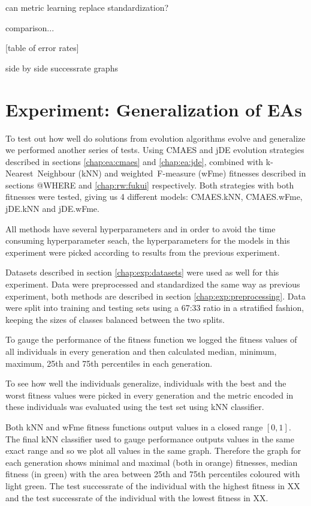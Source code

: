 \documentclass[12pt,a4paper]{report}
\begin{document}
can metric learning replace standardization?

comparison...

[table of error rates]

side by side successrate graphs


\section{Experiment: Generalization of EAs} \label{chap:exp:fitness}

To test out how well do solutions from evolution algorithms evolve and generalize we performed another series of tests. Using CMAES and jDE evolution strategies described in sections \ref{chap:ea:cmaes} and \ref{chap:ea:jde}, combined with k-Nearest~Neighbour (kNN) and weighted~F-measure (wFme) fitnesses described in sections @WHERE and \ref{chap:rw:fukui} respectively. Both strategies with both fitnesses were tested, giving us 4 different models: CMAES.kNN, CMAES.wFme, jDE.kNN and jDE.wFme.

All methods have several hyperparameters and in order to avoid the time consuming hyperparameter seach, the hyperparameters for the models in this experiment were picked according to results from the previous experiment.

Datasets described in section \ref{chap:exp:datasets} were used as well for this experiment. Data were preprocessed and standardized the same way as previous experiment, both methods are described in section \ref{chap:exp:preprocessing}. Data were split into training and testing sets using a 67:33 ratio in a stratified fashion, keeping the sizes of classes balanced between the two splits.

To gauge the performance of the fitness function we logged the fitness values of all individuals in every generation and then calculated median, minimum, maximum, 25th and 75th percentiles in each generation.

To see how well the individuals generalize, individuals with the best and the worst fitness values were picked in every generation and the metric encoded in these individuals was evaluated using the test set using kNN classifier.

Both kNN and wFme fitness functions output values in a closed range $[0,1]$. The final kNN classifier used to gauge performance outputs values in the same exact range and so we plot all values in the same graph. Therefore the graph for each generation shows minimal and maximal (both in orange) fitnesses, median fitness (in green) with the area between 25th and 75th percentiles coloured with light green. The test successrate of the individual with the highest fitness in XX and the test successrate of the individual with the lowest fitness in XX.
\end{document}
